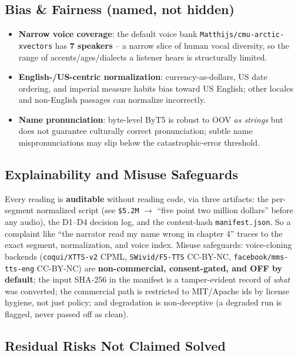 \documentclass[12pt,a4paper]{article}
\begin{document}
\subsection{Bias \& Fairness (named, not hidden)}

\begin{itemize}\setlength\itemsep{0.15em}
  \item \textbf{Narrow voice coverage}: the default voice bank \texttt{Matthijs/cmu-arctic-xvectors} has \textbf{7 speakers} -- a narrow slice of human vocal diversity, so the range of accents/ages/dialects a listener hears is structurally limited.
  \item \textbf{English-/US-centric normalization}: currency-as-dollars, US date ordering, and imperial measure habits bias toward US English; other locales and non-English passages can normalize incorrectly.
  \item \textbf{Name pronunciation}: byte-level ByT5 is robust to OOV \emph{as strings} but does not guarantee culturally correct pronunciation; subtle name mispronunciations may slip below the catastrophic-error threshold.
\end{itemize}

\subsection{Explainability and Misuse Safeguards}

Every reading is \textbf{auditable} without reading code, via three artifacts: the per-segment normalized script (see \texttt{\$5.2M} $\rightarrow$ ``five point two million dollars'' before any audio), the D1--D4 decision log, and the content-hash \texttt{manifest.json}. So a complaint like ``the narrator read my name wrong in chapter 4'' traces to the exact segment, normalization, and voice index. Misuse safeguards: voice-cloning backends (\texttt{coqui/XTTS-v2} CPML, \texttt{SWivid/F5-TTS} CC-BY-NC, \texttt{facebook/mms-tts-eng} CC-BY-NC) are \textbf{non-commercial, consent-gated, and OFF by default}; the input SHA-256 in the manifest is a tamper-evident record of \emph{what} was converted; the commercial path is restricted to MIT/Apache ids by license hygiene, not just policy; and degradation is non-deceptive (a degraded run is flagged, never passed off as clean).

\subsection{Residual Risks Not Claimed Solved}
\end{document}
